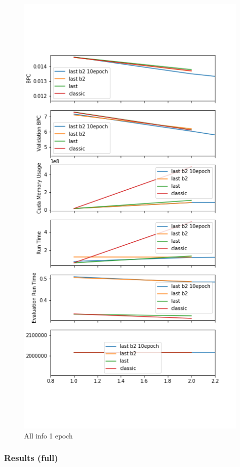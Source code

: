 \begin{figure}[H]
\centering
\includegraphics[height=.8\textheight]{parts/appendix/reports-gmsnn/docs_esteban-latex/test_reports/2018-06-12/history_frac_1e.png}
\caption{All info 1 epoch}
\end{figure}

\subsubsection{Results (full)}


